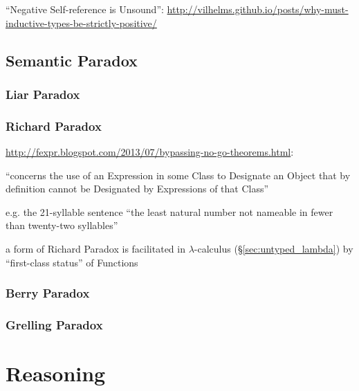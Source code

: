 ``Negative Self-reference is Unsound'':
\url{http://vilhelms.github.io/posts/why-must-inductive-types-be-strictly-positive/}



\subsection{Semantic Paradox}\label{sec:semantic_paradox}

\subsubsection{Liar Paradox}\label{sec:liar_paradox}

\subsubsection{Richard Paradox}\label{sec:richard_paradox}

\url{http://fexpr.blogspot.com/2013/07/bypassing-no-go-theorems.html}:

``concerns the use of an Expression in some Class to Designate an
Object that by definition cannot be Designated by Expressions of that
Class''

e.g. the 21-syllable sentence ``the least natural number not nameable
in fewer than twenty-two syllables''

a form of Richard Paradox is facilitated in $\lambda$-calculus
(\S\ref{sec:untyped_lambda}) by ``first-class status'' of Functions



\subsubsection{Berry Paradox}\label{sec:berry_paradox}

\subsubsection{Grelling Paradox}\label{sec:grelling_paradox}



\section{Reasoning}\label{sec:reasoning}

